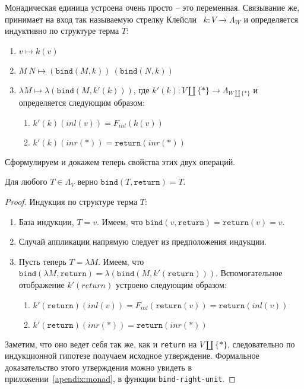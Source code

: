 Монадическая единица устроена очень просто -- это переменная. Связывание же, принимает на вход так называемую стрелку Клейсли~\cite{kleisliArrows} $k : V \to \Lambda_{W}$ и определяется индуктивно по структуре терма $T$:

\begin{enumerate}
  \item $v \mapsto k(v)$
  \item $M\ N \mapsto (\texttt{bind}(M, k))\ (\texttt{bind}(N, k))$
  \item $\lambda M \mapsto \lambda(\texttt{bind}(M, k'(k)))$, где $k'(k) : V \coprod \{*\} \to \Lambda_{W \coprod \{*\}}$ и определяется следующим образом:
    \begin{enumerate}
      \item $k'(k)(inl(v)) = F_{inl}(k(v))$
      \item $k'(k)(inr(*)) = \texttt{return}(inr(*))$
    \end{enumerate}
\end{enumerate}


Сформулируем и докажем теперь свойства этих двух операций.

\begin{prop}
  \label{monad:bind-right-unit}
  Для любого $T \in \Lambda_{V}$ верно $\texttt{bind}(T, \texttt{return}) = T$.
\end{prop}

\begin{proof}
  Индукция по структуре терма $T$:
  \begin{enumerate}
    \item База индукции, $T = v$. Имеем, что $\texttt{bind}(v, \texttt{return}) = \texttt{return}(v) = v$.
    \item Случай аппликации напрямую следует из предположения индукции.
    \item Пусть теперь $T = \lambda M$. Имеем, что $\texttt{bind}(\lambda M, \texttt{return}) = \lambda (\texttt{bind}(M, k'(\texttt{return})))$. Вспомогательное отображение $k'(return)$ устроено следующим образом:
    \begin{enumerate}
      \item $k'(\texttt{return})(inl(v)) = F_{inl}(\texttt{return}(v)) = \texttt{return}(inl(v))$
      \item $k'(\texttt{return})(inr(*)) = \texttt{return}(inr(*))$
    \end{enumerate}
  \end{enumerate}

  Заметим, что оно ведет себя так же, как и \texttt{return} на $V \coprod \{*\}$, следовательно по индукционной гипотезе получаем исходное утверждение.
  Формальное доказательство этого утверждения можно увидеть в приложении~\ref{apendix:monad}, в функции \texttt{bind-right-unit}.
\end{proof}

